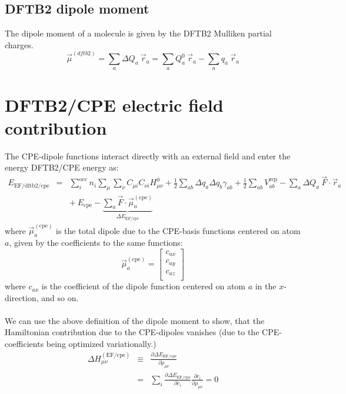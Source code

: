 \documentclass{article}
\numberwithin{equation}{section}
\begin{document}
\subsection{DFTB2 dipole moment}
The dipole moment of a molecule is given by the DFTB2 Mulliken partial charges.
\begin{equation}
    \vec{\mu}^{(dftb2)} = \sum_a \Delta Q_a\ \vec{r}_a = \sum_a Q^0_a\ \vec{r}_a - \sum_a q_a\ \vec{r}_a 
\end{equation}


\section{DFTB2/CPE electric field contribution}
The CPE-dipole functions interact directly with an external field and enter the energy DFTB2/CPE energy as:
\begin{eqnarray}
    E_\mathrm{EF/dftb2/cpe} 
    &=& \sum_i^\mathrm{occ} n_i  \sum_\mu \sum_\nu C_{\mu i}  C_{\nu i} H^0_{\mu\nu} + \frac{1}{2} \sum_{ab} \Delta q_a \Delta q_b \gamma_{ab}+ \frac{1}{2} \sum_{ab} V^\mathrm{rep}_{ab} - \sum_a \Delta Q_a\ \vec{F} \cdot \vec{r}_a\nonumber\\
    && +\ E_{\mathrm{cpe}} - \underbrace{\sum_a \vec{F} \cdot \vec{\mu}^{\mathrm{(cpe)}}_a}_{\Delta E_{\mathrm{EF/cpe}}}
\end{eqnarray}
where $\vec{\mu}^{\mathrm{(cpe)}}_a$ is the total dipole due to the CPE-basis functions centered on atom $a$, given by the coefficients to the same functions:
\begin{equation}
    \vec{\mu}^{\mathrm{(cpe)}}_a =  
    \begin{bmatrix}
        c_{ax}\\
        c_{ay}\\
        c_{az}\\
    \end{bmatrix}
\end{equation}
where $c_{ax}$ is the coefficient of the dipole function centered on atom $a$ in the $x$-direction, and so on.
\\\\We can use the above definition of the dipole moment to show, that the Hamiltonian contribution due to the CPE-dipoles vanishes (due to the CPE-coefficients being optimized variationally.)
\begin{eqnarray}
    \Delta H_{\mu\nu}^{\mathrm{(EF/cpe)}} 
    &\equiv& \frac{\partial \Delta E_{\mathrm{EF/cpe}}}{\partial \rho_{\mu\nu}}\nonumber\\
    &=&  \sum_i \frac{\partial \Delta E_{\mathrm{EF/cpe}}}{\partial c_i} 
     \frac{\partial c_i}{\partial \rho_{\mu\nu}}= 0
\end{eqnarray}
\end{document}
